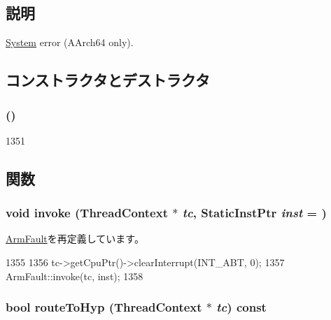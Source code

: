 \subsection{説明}
\hyperlink{classSystem}{System} error (AArch64 only). 

\subsection{コンストラクタとデストラクタ}
\hypertarget{classArmISA_1_1SystemError_a952c3a95357c9c6e8602a0853d8f982c}{
\subsubsection[{SystemError}]{ ()}}
\label{classArmISA_1_1SystemError_a952c3a95357c9c6e8602a0853d8f982c}



\begin{DoxyCode}
1351 {}
\end{DoxyCode}


\subsection{関数}
\hypertarget{classArmISA_1_1SystemError_a2bd783b42262278d41157d428e1f8d6f}{
\subsubsection[{invoke}]{\setlength{\rightskip}{0pt plus 5cm}void invoke ({\bf ThreadContext} $\ast$ {\em tc}, \/  {\bf StaticInstPtr} {\em inst} = {})}}
\label{classArmISA_1_1SystemError_a2bd783b42262278d41157d428e1f8d6f}


\hyperlink{classArmISA_1_1ArmFault_a2bd783b42262278d41157d428e1f8d6f}{ArmFault}を再定義しています。


\begin{DoxyCode}
1355 {
1356     tc->getCpuPtr()->clearInterrupt(INT_ABT, 0);
1357     ArmFault::invoke(tc, inst);
1358 }
\end{DoxyCode}
\hypertarget{classArmISA_1_1SystemError_a16facd13ba8e6d15d2b865882c379d5f}{
\subsubsection[{routeToHyp}]{\setlength{\rightskip}{0pt plus 5cm}bool routeToHyp ({\bf ThreadContext} $\ast$ {\em tc}) const}}
\label{classArmISA_1_1SystemError_a16facd13ba8e6d15d2b865882c379d5f}


